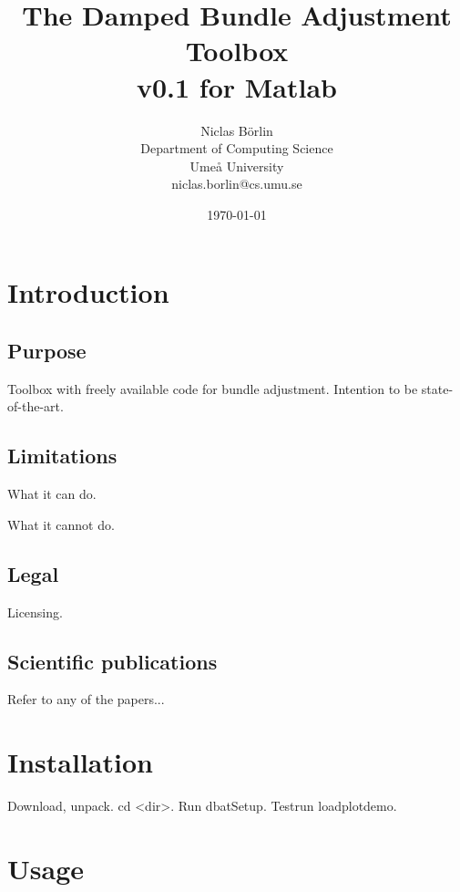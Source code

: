 \documentclass{article}
\begin{document}
\title{The Damped Bundle Adjustment Toolbox\\v0.1 for Matlab}
\author{Niclas B{\"o}rlin\\Department of Computing Science\\Ume{\aa}
  University\\niclas.borlin@cs.umu.se}
\date{\today}

\maketitle

\tableofcontents

\section{Introduction}

\subsection{Purpose}

Toolbox with freely available code for bundle adjustment. Intention to
be state-of-the-art.

\subsection{Limitations}

What it can do.

What it cannot do.

\subsection{Legal}

Licensing.

\subsection{Scientific publications}

Refer to any of the papers...

\section{Installation}

Download, unpack. cd <dir>. Run dbatSetup. Testrun loadplotdemo.

\section{Usage}
\end{document}
